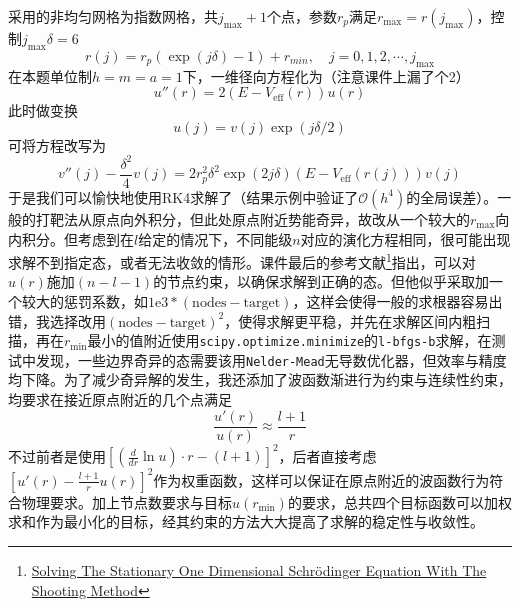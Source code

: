 采用的非均匀网格为指数网格，共$j_{\text{max}}+1$个点，参数$r_p$满足$r_{\text{max}} = r(j_{\text{max}})$，控制$j_{\text{max}} \delta =6$
\[
    r(j) =r_p (\exp(j \delta) -1)+ r_{min}, \quad j=0,1,2,\cdots, j_{\text{max}}
\]
在本题单位制$h=m=a=1$下，一维径向方程化为（注意课件上漏了个2）
\[
    u''(r) = 2(E-V_{\text{eff}}(r))u(r)
\]
此时做变换
\[
    u(j) = v(j) \exp(j \delta/2)
\]
可将方程改写为
\[
    v''(j) -\frac{\delta ^2}{4}v(j) = 2r_p^2 \delta^2 \exp(2 j \delta) (E-V_{\text{eff}}(r(j)))v(j)
\]
于是我们可以愉快地使用RK4求解了（结果示例中验证了$\mathcal{O}(h^4)$的全局误差）。一般的打靶法从原点向外积分，但此处原点附近势能奇异，故改从一个较大的$r_\text{max}$向内积分。但考虑到在$l$给定的情况下，不同能级$n$对应的演化方程相同，很可能出现求解不到指定态，或者无法收敛的情形。课件最后的参考文献\footnote{\href{https://www.iue.tuwien.ac.at/uploads/tx_sbdownloader/Bachelor-Arbeit_Marie_ERTL_09-2016.pdf}{Solving The Stationary One Dimensional Schrödinger Equation With The Shooting Method}}指出，可以对$u(r)$施加$(n - l - 1)$的节点约束，以确保求解到正确的态。但他似乎采取加一个较大的惩罚系数，如$1\mathrm{e}3*(\text{nodes}-\text{target})$，这样会使得一般的求根器容易出错，我选择改用$(\text{nodes}-\text{target})^2$，使得求解更平稳，并先在求解区间内粗扫描，再在$r_{\text{min}}$最小的值附近使用\texttt{scipy.optimize.minimize}的\texttt{l-bfgs-b}求解，在测试中发现，一些边界奇异的态需要该用\texttt{Nelder-Mead}无导数优化器，但效率与精度均下降。为了减少奇异解的发生，我还添加了波函数渐进行为约束与连续性约束，均要求在接近原点附近的几个点满足
\[
    \frac{u'(r)}{u(r)} \approx \frac{l+1}{r}
\]
不过前者是使用\([(\frac{d}{dr}\ln{u}) \cdot r -(l+1)]^2\)，后者直接考虑\([u'(r)-\frac{l+1}{r}u(r)]^2\)作为权重函数，这样可以保证在原点附近的波函数行为符合物理要求。加上节点数要求与目标$u(r_\text{min})$的要求，总共四个目标函数可以加权求和作为最小化的目标，经其约束的方法大大提高了求解的稳定性与收敛性。

